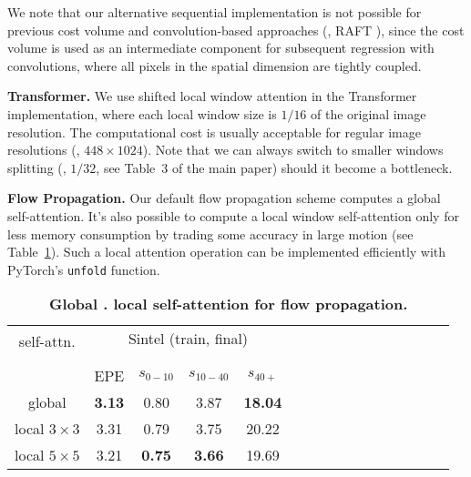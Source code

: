 \documentclass[10pt,twocolumn,letterpaper]{article}
\begin{document}
We note that our alternative sequential implementation is not possible for previous cost volume and convolution-based approaches (\eg, RAFT \cite{teed2020raft}), since the cost volume is used as an intermediate component for subsequent regression with convolutions, where all pixels in the spatial dimension are tightly coupled.




{\bf Transformer.} We use shifted local window attention \cite{liu2021Swin} in the Transformer implementation, where each local window size is $1/16$ of the original image resolution. The computational cost is usually acceptable for regular image resolutions (\eg, $448 \times 1024$). Note that we can always switch to smaller windows splitting (\eg, $1/32$, see Table~3 of the main paper) should it become a bottleneck.



{\bf Flow Propagation.} Our default flow propagation scheme computes a global self-attention. It's also possible to compute a local window self-attention only for less memory consumption by trading some accuracy in large motion (see Table~\ref{tab:global_local_prop}). Such a local attention operation can be implemented efficiently with PyTorch's \texttt{unfold} function.



\begin{table}[H]
    \centering
    \setlength{\tabcolsep}{3.pt} %
    \begin{tabular}{cccccccccccccccc}
    \toprule
    
    \multirow{2}{*}[-2pt]{self-attn.} & \multicolumn{4}{c}{Sintel (train, final)}  & \\
    \addlinespace[-12pt] \\
    \cmidrule(lr){2-5} 
    \addlinespace[-12pt] \\
    & EPE & $s_{0-10}$ & $s_{10-40}$ & $s_{40+}$  \\
    \midrule
    
    global & \textbf{3.13} & 0.80 & 3.87 & \textbf{18.04} \\
    local $3 \times 3$ & 3.31 & 0.79 & 3.75 & 20.22 \\
    local $5 \times 5$ & 3.21 & \textbf{0.75} & \textbf{3.66} & 19.69 \\

    \bottomrule
    \end{tabular}
    \vspace{-5pt}
    \caption{\textbf{Global \vs. local self-attention for flow propagation.}
    }
    \label{tab:global_local_prop}
    \vspace{-10pt}
    
\end{table}
\end{document}

